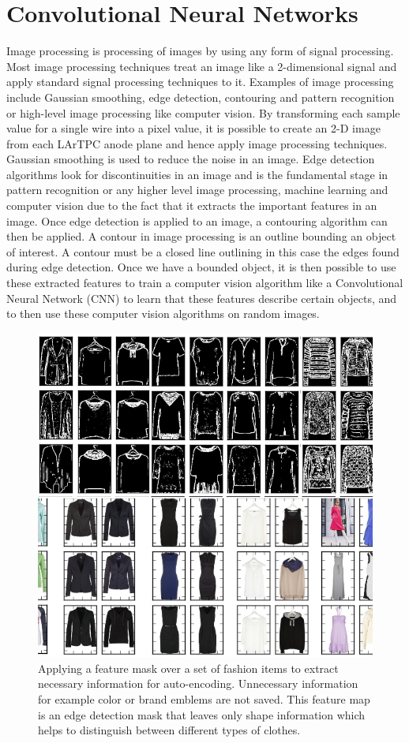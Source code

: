 \chapter{Convolutional Neural Networks}\label{ch:cnn}
Image processing is processing of images by using any form of signal processing. Most image processing techniques treat an image like a 2-dimensional signal and apply standard signal processing techniques to it. Examples of image processing include Gaussian smoothing, edge detection, contouring and pattern recognition or high-level image processing like computer vision. By transforming each sample value for a single wire into a pixel value, it is possible to create an 2-D image from each LArTPC anode plane and hence apply image processing techniques. Gaussian smoothing is used to reduce the noise in an image. Edge detection algorithms look for discontinuities in an image and is the fundamental stage in pattern recognition or any higher level image processing, machine learning and computer vision due to the fact that it extracts the important features in an image. Once edge detection is applied to an image, a contouring algorithm can then be applied. A contour in image processing is an outline bounding an object of interest. A contour must be a closed line outlining in this case the edges found during edge detection. Once we have a bounded object, it is then possible to use these extracted features to train a computer vision algorithm like a Convolutional Neural Network (CNN) to learn that these features describe certain objects, and to then use these computer vision algorithms on random images.


\begin{figure}[t!]
\centering
\includegraphics[width=.48\linewidth]{figs/convolution.png}
\caption{Applying a feature mask over a set of fashion items to extract necessary information for auto-encoding. Unnecessary information for example color or brand emblems are not saved. This feature map is an edge detection mask that leaves only shape information which helps to distinguish between different types of clothes.} 
\label{fig:convolution}
\end{figure}


